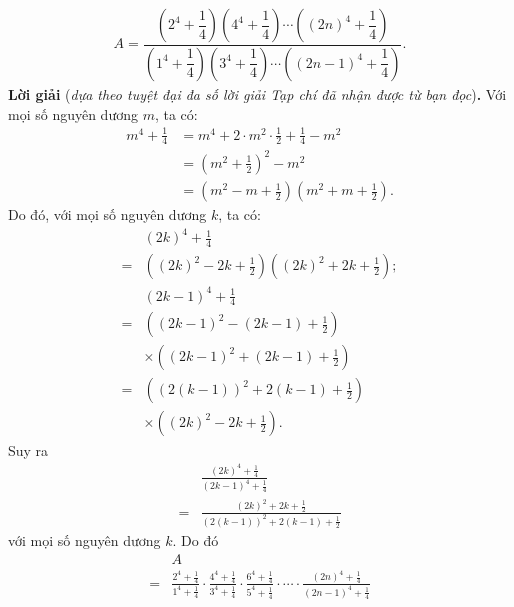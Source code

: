 \begin{multicols}{2}
	\begin{align*}
		A\!=\!\dfrac{\left(2^4\!+\!\dfrac14\right)\!\left(4^4\!+\!\dfrac14\right)\!\cdots\! \left((2n)^4\!+\!\dfrac14\right)}{\left(1^4\!+\!\dfrac14\right)\left(3^4\!+\!\dfrac14\right)\!\cdots\! \left((2n\!-\!1)^4\!+\!\dfrac14\right)}.
	\end{align*}
	\textbf{\color{thachthuctoanhoc}Lời giải} (\textit{dựa theo tuyệt đại đa số lời giải Tạp chí đã nhận được từ bạn đọc})\textbf{\color{thachthuctoanhoc}.}
	\vskip 0.05cm
	Với mọi số nguyên dương $m$, ta có:
	\begin{align*}
		{m^4} + \frac{1}{4} &= {m^4} + 2 \cdot {m^2} \cdot \frac{1}{2} + \frac{1}{4} - {m^2}\\[-0.6ex]
		& = {\left( {{m^2} + \frac{1}{2}} \right)^2} - {m^2}\\[-0.6ex]
		 &= \left( {{m^2} - m + \frac{1}{2}} \right)\left( {{m^2} + m + \frac{1}{2}} \right).
	\end{align*}
	Do đó, với mọi số nguyên dương $k$, ta có:
	\begin{align*}
		&{\left( {2k} \right)^4} + \frac{1}{4} \\[-0.6ex]
		= &\left( {{{\left( {2k} \right)}^2} - 2k + \frac{1}{2}} \right)\left( {{{\left( {2k} \right)}^2} + 2k + \frac{1}{2}} \right);\\[-0.6ex]
			&{\left( {2k - 1} \right)^4} + \frac{1}{4} \\[-0.6ex]
			= &\left(\left( {2k - 1} \right)^2 - \left( {2k - 1} \right) + \frac{1}{2}\right)\\[-0.6ex]
			&\times\left( \left( {2k - 1} \right)^2 + \left( {2k - 1} \right) + \frac{1}{2} \right)\\[-0.6ex]
			 = &\left( \left( 2\left( {k - 1} \right) \right)^2 + 2\left(k - 1 \right) + \frac{1}{2}\right)\\[-0.6ex]
			 &\times\left(\left( {2k} \right)^2 - 2k + \frac{1}{2}\right).
	\end{align*}
	Suy ra
	\begin{align*}
		&\frac{{{{\left( {2k} \right)}^4} + \frac{1}{4}}}{{{{\left( {2k - 1} \right)}^4} + \frac{1}{4}}} \\[-0.6ex]
		= &\frac{{{{\left( {2k} \right)}^2} + 2k + \frac{1}{2}}}{{{{\left( {2\left( {k - 1} \right)} \right)}^2} + 2\left( {k - 1} \right) + \frac{1}{2}}}
	\end{align*}
	với mọi số nguyên dương $k$.
	\vskip 0.05cm
	Do đó
	\begin{align*}
			&A \\[-0.6ex]
			= &\frac{{{2^4} \!+\! \frac{1}{4}}}{{{1^4} \!+\! \frac{1}{4}}} \!\cdot\! \frac{{{4^4} \!+\! \frac{1}{4}}}{{{3^4} \!+\! \frac{1}{4}}} \!\cdot\! \frac{{{6^4} \!+\! \frac{1}{4}}}{{{5^4} \!+\! \frac{1}{4}}} \cdot  \cdots  \cdot \frac{{{{\left( {2n} \right)}^4} \!+\! \frac{1}{4}}}{{{{\left( {2n \!-\! 1} \right)}^4} \!+\! \frac{1}{4}}}

\end{align*}
\end{multicols}
